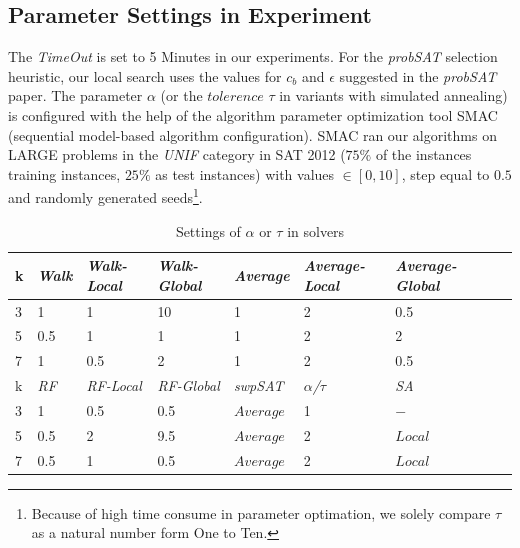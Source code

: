 \documentclass[12pt,a4paper,twoside]{scrartcl}
\numberwithin{equation}{section}
\begin{document}
\subsection{Parameter Settings in Experiment}
The \emph{TimeOut} is set to 5 Minutes in our experiments.  For the \emph{probSAT} selection heuristic, our local search uses the values for $c_b$ and $\epsilon$ suggested in the \emph{probSAT} paper.  The parameter $\alpha$ (or the $tolerence$ $ \tau$ in variants with simulated annealing) is  configured with the help of the algorithm parameter optimization tool SMAC\cite{SMAC} (sequential model-based algorithm configuration). SMAC ran our algorithms on LARGE problems in the \emph{UNIF} category in SAT 2012 ($75\%$ of the instances training instances,  $25\%$ as test instances) with values $\in [0, 10]$, step equal to $0.5$ and randomly generated seeds\footnote{Because of high time consume in parameter optimation, we solely compare $\tau$  as a natural number form One to Ten.}.
   \begin{table}[H]
\begin{center}
    \begin{tabular}{|l|l|l|l||l|l|l|l|p{1cm}|}
\hline 

    k &\emph{Walk}&\emph{Walk-Local}&\emph{Walk-Global}&\emph{Average}&\emph{Average-Local}&\emph{Average-Global} \\ \hline
    3 & 1& 1 & 10 &  1 & 2& 0.5       \\ \hline  
    5 & 0.5& 1 & 1&  1 & 2& 2 \\ \hline  
    7 & 1& 0.5 & 2&  1 & 2& 0.5  \\ \hline  
 \hline  
    k &\emph{RF}&\emph{RF-Local}&\emph{RF-Global}&\emph{swpSAT}&\emph{$\alpha$/$\tau$}&\emph{SA} \\ \hline  
    3 & 1& 0.5 & 0.5&$Average$ & 1 & $-$\\ \hline 
    5 & 0.5& 2& 9.5&$Average$& 2 & $Local$\\ \hline 
    7 & 0.5& 1& 0.5 &$Average$&2 & $Local$\\ \hline 

	
\end{tabular}
\caption{Settings of $\alpha$ or $\tau$ in solvers}
\end{center}
\end{table}
\end{document}
